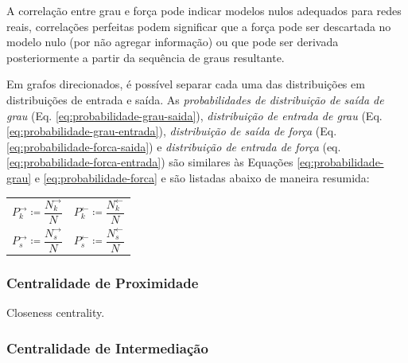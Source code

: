 \documentclass[12pt,a4paper]{article}
\theoremstyle{hypo}
\newcommand{\defn}{\coloneqq} %
\newcommand{\linkin}[1]{#1^\leftarrow} %
\newcommand{\linkout}[1]{#1^\rightarrow} %
\begin{document}
A correlação entre grau e força pode indicar modelos nulos adequados para redes reais, correlações perfeitas podem significar que a força pode ser descartada no modelo nulo (por não agregar informação) ou que pode ser derivada posteriormente a partir da sequência de graus resultante.

Em grafos direcionados, é possível separar cada uma das distribuições em distribuições de entrada e saída. As \textit{probabilidades de distribuição de saída de grau} (Eq. \ref{eq:probabilidade-grau-saida}), \textit{distribuição de entrada de grau} (Eq. \ref{eq:probabilidade-grau-entrada}), \textit{distribuição de saída de força} (Eq. \ref{eq:probabilidade-forca-saida}) e \textit{distribuição de entrada de força} (eq. \ref{eq:probabilidade-forca-entrada}) são similares às Equações \ref{eq:probabilidade-grau} e \ref{eq:probabilidade-forca} e são listadas abaixo de maneira resumida:

\noindent
\begin{tabularx}{\linewidth}{@{}XX@{}}
  \begin{equation} \label{eq:probabilidade-grau-saida}
  	\linkout{P}_k \defn \frac{\linkout{N}_k}{N}
  \end{equation} &
  \begin{equation} \label{eq:probabilidade-grau-entrada}
  	\linkin{P}_k \defn \frac{\linkin{N}_k}{N}
  \end{equation} \\
  \begin{equation} \label{eq:probabilidade-forca-saida}
  	\linkout{P}_s \defn \frac{\linkout{N}_s}{N}
  \end{equation} &
  \begin{equation} \label{eq:probabilidade-forca-entrada}
  	\linkin{P}_s \defn \frac{\linkin{N}_s}{N}
  \end{equation}
\end{tabularx}


\subsubsection{Centralidade de Proximidade}

Closeness centrality.

\subsubsection{Centralidade de Intermediação}
\end{document}
